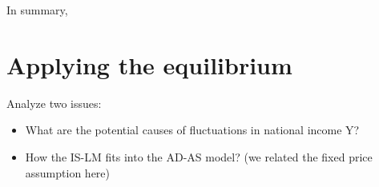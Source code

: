 \documentclass[10pt]{article}
\begin{document}
\begin{figure}[H]
\end{figure}



In summary,

\begin{figure}[H]
\end{figure}





\section{Applying the equilibrium}
Analyze two issues:
\begin{itemize}
\item What are the potential causes of fluctuations in national income Y?
\item How the IS-LM fits into the AD-AS model? (we related the fixed price assumption here)
\end{itemize}
\end{document}
